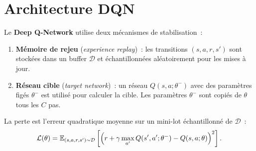 \section{Architecture DQN}

\begin{definition}[DQN]
Le \textbf{Deep Q-Network} utilise deux m\'ecanismes de stabilisation~:
\begin{enumerate}
    \item \textbf{M\'emoire de rejeu} (\emph{experience replay})~: les transitions
    $(s, a, r, s')$ sont stock\'ees dans un buffer $\mathcal{D}$ et \'echantillonn\'ees
    al\'eatoirement pour les mises \`a jour.
    \item \textbf{R\'eseau cible} (\emph{target network})~: un r\'eseau $Q(s,a;\theta^-)$
    avec des param\`etres fig\'es $\theta^-$ est utilis\'e pour calculer la cible.
    Les param\`etres $\theta^-$ sont copi\'es de $\theta$ tous les $C$ pas.
\end{enumerate}
\end{definition}

\begin{formules}[title=\textbf{Fonction de perte DQN}]
La perte est l'erreur quadratique moyenne sur un mini-lot \'echantillonn\'e
de $\mathcal{D}$~:
\[
    \mathcal{L}(\theta) = \mathbb{E}_{(s,a,r,s') \sim \mathcal{D}} \left[
    \left( r + \gamma \max_{a'} Q(s', a'; \theta^-) - Q(s, a; \theta) \right)^2
    \right].
\]
\end{formules}

